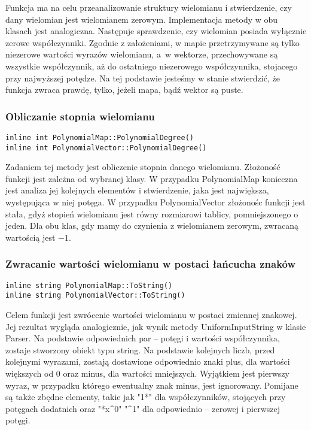 Funkcja ma na celu przeanalizowanie struktury wielomianu i stwierdzenie, czy dany wielomian jest wielomianem zerowym. Implementacja metody w obu klasach jest analogiczna. Następuje sprawdzenie, czy wielomian posiada wyłącznie zerowe współczynniki. Zgodnie z założeniami, w mapie przetrzymywane są tylko niezerowe wartości wyrazów wielomianu, a~w wektorze, przechowywane są wszystkie współczynnik, aż do ostatniego niezerowego współczynnika, stojacego przy najwyższej potędze. Na tej podstawie jesteśmy w stanie stwierdzić, że funkcja zwraca prawdę, tylko, jeżeli mapa, bądź wektor są puste.

\subsubsection{Obliczanie stopnia wielomianu}
\begin{lstlisting}
inline int PolynomialMap::PolynomialDegree()
inline int PolynomialVector::PolynomialDegree()
\end{lstlisting}

Zadaniem tej metody jest obliczenie stopnia danego wielomianu. Złożoność funkcji jest zależna od wybranej klasy. W przypadku PolynomialMap konieczna jest analiza jej kolejnych elementów i stwierdzenie, jaka jest największa, występująca w niej potęga. W przypadku PolynomialVector złożonośc funkcji jest stała, gdyż stopień wielomianu jest równy rozmiarowi tablicy, pomniejszonego o jeden. Dla obu klas, gdy mamy do czynienia z wielomianem zerowym, zwracaną wartością jest $-1$.

\subsubsection{Zwracanie wartości wielomianu w postaci łańcucha znaków}
\begin{lstlisting}
inline string PolynomialMap::ToString()
inline string PolynomialVector::ToString()
\end{lstlisting}

Celem funkcji jest zwrócenie wartości wielomianu w postaci zmiennej znakowej. Jej rezultat wygląda analogicznie, jak wynik metody UniformInputString w klasie Parser. Na podstawie odpowiednich par – potęgi i wartości współczynnika, zostaje stworzony obiekt typu string. Na podstawie kolejnych liczb, przed kolejnymi wyrazami, zostają dostawione odpowiednio znaki plus, dla wartości większych od $0$ oraz minus, dla wartości mniejszych. Wyjątkiem jest pierwszy wyraz, w przypadku którego ewentualny znak minus, jest ignorowany. Pomijane są także zbędne elementy, takie jak "1*" dla współczynników, stojących przy potęgach dodatnich oraz "*x\^{}0" "\^{}1" dla odpowiednio – zerowej i pierwszej potęgi.


